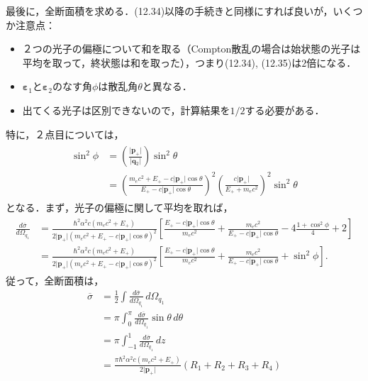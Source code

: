 最後に，全断面積を求める．(12.34)以降の手続きと同様にすれば良いが，いくつか注意点：
\begin{itemize}
  \item ２つの光子の偏極について和を取る（Compton散乱の場合は始状態の光子は平均を取って，終状態は和を取った），つまり(12.34), (12.35)は$2$倍になる．
  \item $\boldsymbol{\varepsilon}_1$と$\boldsymbol{\varepsilon}_2$のなす角$\phi$は散乱角$\theta$と異なる．
  \item 出てくる光子は区別できないので，計算結果を$1/2$する必要がある．
\end{itemize}
特に，２点目については，
\begin{align}
  \begin{split}
    \sin^2\phi &= \left(\frac{\lvert\boldsymbol{p}_+\rvert}{\lvert\boldsymbol{q}_2\rvert}\right)\sin^2\theta \\
    &= \left(\frac{m_ec^2 + E_+ - c\lvert\boldsymbol{p}_+\rvert\cos\theta}{E_+ - c\lvert\boldsymbol{p}_+\rvert\cos\theta}\right)^2 \left(\frac{c\lvert\boldsymbol{p}_+\rvert}{E_+ + m_ec^2}\right)^2 \sin^2\theta
  \end{split}
\end{align}
となる．まず，光子の偏極に関して平均を取れば，
\begin{align}
  \begin{split}
    \frac{d\overline\sigma}{d\Omega_{q_1}} &= \frac{\hbar^2\alpha^2c(m_ec^2 + E_+)}{2\lvert\boldsymbol{p}_+\rvert(m_ec^2 + E_+ - c\lvert\boldsymbol{p}_+\rvert\cos\theta)^2}\left[  \frac{E_+ - c\lvert\boldsymbol{p}_+\rvert\cos\theta}{m_ec^2} + \frac{m_ec^2}{E_+ - c\lvert\boldsymbol{p}_+\rvert\cos\theta} - 4\frac{1+\cos^2\phi}{4} + 2 \right]\\
    &= \frac{\hbar^2\alpha^2c(m_ec^2 + E_+)}{2\lvert\boldsymbol{p}_+\rvert(m_ec^2 + E_+ - c\lvert\boldsymbol{p}_+\rvert\cos\theta)^2}\left[  \frac{E_+ - c\lvert\boldsymbol{p}_+\rvert\cos\theta}{m_ec^2} + \frac{m_ec^2}{E_+ - c\lvert\boldsymbol{p}_+\rvert\cos\theta} + \sin^2\phi \right].
  \end{split}
\end{align}
従って，全断面積は，
\begin{align}
  \overline{\sigma} &= \frac{1}{2}\int \frac{d\overline\sigma}{d\Omega_{q_1}}\,d\Omega_{q_1} \\
  &= \pi\int_0^\pi\frac{d\overline\sigma}{d\Omega_{q_1}}\sin\theta\,d\theta \\
  &= \pi\int_{-1}^1\frac{d\overline\sigma}{d\Omega_{q_1}}\,dz \\
  &= \frac{\pi\hbar^2\alpha^2c(m_ec^2 + E_+)}{2\lvert\boldsymbol{p}_+\rvert}(R_1 + R_2 + R_3 + R_4)\label{cross_section}
\end{align}
